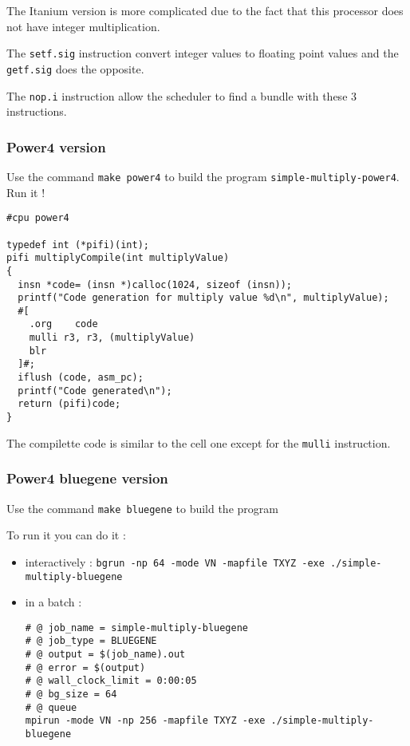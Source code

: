 \documentclass{article}
\begin{document}
The Itanium version is more complicated due to the fact that this
processor does not have integer multiplication.

The \texttt{setf.sig} instruction convert integer values to floating
point values and the \texttt{getf.sig} does the opposite.

The \texttt{nop.i} instruction allow the scheduler to find a bundle
with these 3 instructions.

\subsubsection{Power4 version}

Use the command \texttt{make power4} to build the program
\texttt{simple-multiply-power4}. Run it !

\begin{lstlisting}
#cpu power4

typedef int (*pifi)(int);
pifi multiplyCompile(int multiplyValue)
{
  insn *code= (insn *)calloc(1024, sizeof (insn));
  printf("Code generation for multiply value %d\n", multiplyValue);
  #[
	.org	code
	mulli r3, r3, (multiplyValue)  
	blr
  ]#;
  iflush (code, asm_pc);
  printf("Code generated\n");
  return (pifi)code;
}
\end{lstlisting}

The compilette code is similar to the cell one except for the
\texttt{mulli} instruction.

\subsubsection{Power4 bluegene version}

Use the command \texttt{make bluegene} to build the program

To run it you can do it  :
\begin{itemize}
\item interactively : \texttt{bgrun -np 64 -mode VN -mapfile TXYZ -exe
    ./simple-multiply-bluegene}

\item in a batch :
\begin{verbatim}
# @ job_name = simple-multiply-bluegene
# @ job_type = BLUEGENE
# @ output = $(job_name).out
# @ error = $(output)
# @ wall_clock_limit = 0:00:05
# @ bg_size = 64
# @ queue
mpirun -mode VN -np 256 -mapfile TXYZ -exe ./simple-multiply-bluegene
\end{verbatim}
\end{itemize}
\end{document}
